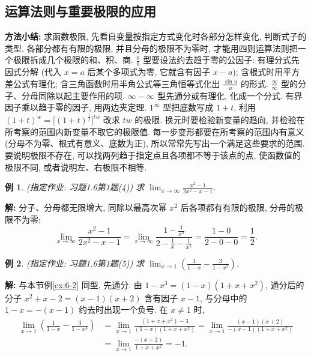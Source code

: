 \documentclass[UTF8,openany]{ctexbook}
\theoremstyle{chinesetextbook}
\newtheorem{example}{例}[section]
\newenvironment{cnsolution}{\par\indent\textbf{解:} \ignorespaces}{\par}
\begin{document}
\subsection{运算法则与重要极限的应用}
\par\indent\textbf{方法小结:} 求函数极限, 先看自变量按指定方式变化时各部分怎样变化, 判断式子的类型. 各部分都有有限的极限, 并且分母的极限不为零时, 才能用四则运算法则把一个极限拆成几个极限的和、积、商. $\displaystyle\frac00$ 型要设法约去趋于零的公因子: 有理分式先因式分解 (代入 $x=a$ 后某个多项式为零, 它就含有因子 $x-a$); 含根式时用平方差公式有理化; 含三角函数时用半角公式等三角恒等式化出 $\displaystyle\frac{\sin u}u$ 的形式. $\displaystyle\frac\infty\infty$ 型的分子、分母同除以起主要作用的项. $\infty-\infty$ 型先通分或有理化, 化成一个分式. 有界因子乘以趋于零的因子, 用两边夹定理. $1^\infty$ 型把底数写成 $1+t$, 利用 $(1+t)^w=\bigl[(1+t)^{\frac1t}\bigr]^{tw}$ 改求 $tw$ 的极限. 换元时要检验新变量的趋向, 并检验在所考察的范围内新变量不取它的极限值. 每一步变形都要在所考察的范围内有意义 (分母不为零、根式有意义、底数为正), 所以常常先写出一个满足这些要求的范围. 要说明极限不存在, 可以找两列趋于指定点且各项都不等于该点的点, 使函数值的极限不同, 或者说明左、右极限不相等.
\begin{example}
\textnormal{(指定作业: 习题1.6第1题(4))} 求 $\displaystyle\lim_{x\to\infty}\frac{x^2-1}{2x^2-x-1}$.
\end{example}
\begin{cnsolution}
分子、分母都无限增大, 同除以最高次幂 $x^2$ 后各项都有有限的极限, 分母的极限不为零:
\[
\lim_{x\to\infty}\frac{x^2-1}{2x^2-x-1}=\lim_{x\to\infty}\frac{1-\frac1{x^2}}{2-\frac1x-\frac1{x^2}}=\frac{1-0}{2-0-0}=\frac12.
\]
\end{cnsolution}
\begin{example}
\textnormal{(指定作业: 习题1.6第1题(5))} 求 $\displaystyle\lim_{x\to1}\left(\frac1{1-x}-\frac3{1-x^3}\right)$.
\end{example}
\begin{cnsolution}
与本节例\ref{ex:6-2} 同型, 先通分. 由 $1-x^3=(1-x)(1+x+x^2)$, 通分后的分子 $x^2+x-2=(x-1)(x+2)$ 含有因子 $x-1$, 与分母中的 $1-x=-(x-1)$ 约去时出现一个负号. 在 $x\ne1$ 时,
\[
\begin{aligned}
\lim_{x\to1}\left(\frac1{1-x}-\frac3{1-x^3}\right)
&=\lim_{x\to1}\frac{(1+x+x^2)-3}{(1-x)(1+x+x^2)}=\lim_{x\to1}\frac{(x-1)(x+2)}{-(x-1)(1+x+x^2)}\\
&=\lim_{x\to1}\frac{-(x+2)}{1+x+x^2}=-1.
\end{aligned}
\]
\end{cnsolution}
\end{document}
